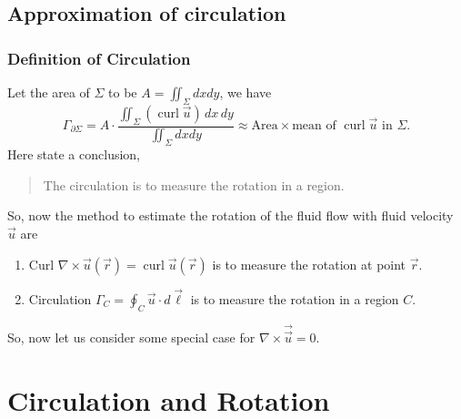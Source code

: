 \documentclass[11pt,]{beamer}
\begin{document}
\subsection{Approximation of circulation}
\begin{frame}
\frametitle{Definition of Circulation}
	Let the area of $\Sigma$ to be $\displaystyle A = \iint_{\Sigma} dxdy$, we have 
	\begin{equation}
	\Gamma_{\partial \Sigma} = A \cdot \frac{\displaystyle\iint_{\Sigma} \left(\operatorname{curl}	\vec{u}\right)\,dx\,dy}{\displaystyle\iint_{\Sigma} dxdy}
	\approx \text{Area}\times\text{mean of $\operatorname{curl}\vec{u}$ in $\Sigma$.}
	\end{equation}
	Here state a conclusion,
	\begin{quote}
	\bigskip
	The circulation is to measure the rotation in a region.
	\end{quote}

\end{frame}
\begin{frame}
	So, now the method to estimate the rotation of the fluid flow with fluid velocity $\vec{u}$ are 
	\begin{enumerate}
	\item Curl $\nabla \times \vec{u}(\vec{r}) = \operatorname{curl}\vec{u}(\vec{r})$ is to measure the rotation at point $\vec{r}$.
	\item Circulation $\displaystyle \Gamma_{C} = \oint_{C}\vec{u}\cdot d\vec{\ell}$ is to measure the rotation in a region $C$.
	\end{enumerate}
	So, now let us consider some special case for $\nabla\times\vec{\vec{u}}=0$. 
\end{frame}
\section{Circulation and Rotation}
\end{document}
